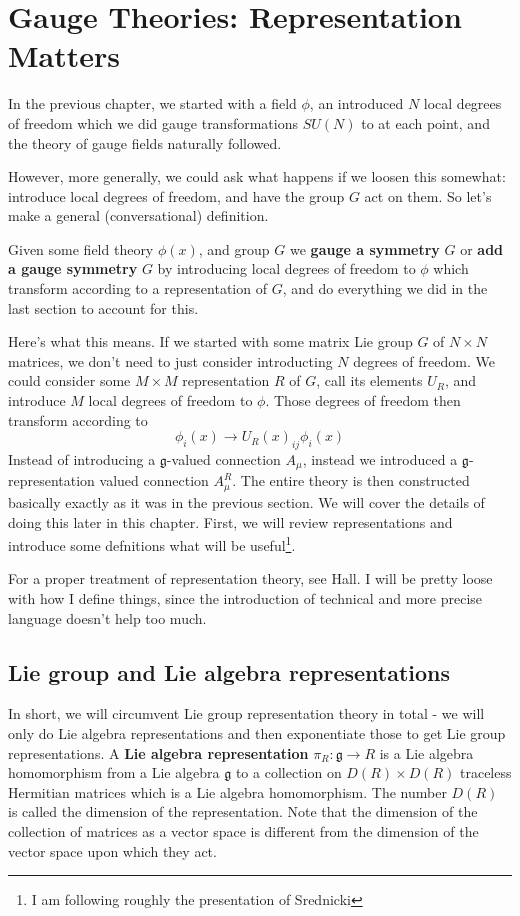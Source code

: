 \documentclass[main.tex]{subfiles}
\begin{document}
\chapter{Gauge Theories: Representation Matters}
In the previous chapter, we started with a field $\phi$, an introduced $N$ local degrees of freedom which we did gauge transformations $SU(N)$ to at each point, and the theory of gauge fields naturally followed.

However, more generally, we could ask what happens if we loosen this somewhat: introduce local degrees of freedom, and have the group $G$ act on them. So let's make a general (conversational) definition.

\begin{defn}
Given some field theory $\phi(x)$, and group $G$ we \textbf{gauge a symmetry} $G$ or \textbf{add a gauge symmetry} $G$ by introducing local degrees of freedom to $\phi$ which transform according to a representation of $G$, and do everything we did in the last section to account for this.
\end{defn}

Here's what this means. If we started  with some matrix Lie group $G$ of $N \times N$ matrices, we don't need to just consider introducting $N$ degrees of freedom. We could consider some $M \times M$ representation $R$ of $G$, call its elements $U_R$, and introduce $M$ local degrees of freedom to $\phi$. Those degrees of freedom then transform according to 
\[
\phi_i (x)\to U_R (x)_{ij} \phi_i (x)
\]
Instead of introducing a $\mathfrak{g}$-valued connection $A_\mu$, instead we introduced a $\mathfrak{g}$-representation valued connection $A_\mu^R$. The entire theory is then constructed basically exactly as it was in the previous section. We will cover the details of doing this later in this chapter. First, we will review representations and introduce some defnitions what will be useful\footnote{I am following roughly the presentation of Srednicki\cite{Sred1}}.

For a proper treatment of representation theory, see Hall\cite{Hall1}. I will be pretty loose with how I define things, since the introduction of technical and more precise language doesn't help too much.

\newpage
\section{Lie group and Lie algebra representations}
In short, we will circumvent Lie group representation theory in total - we will only do Lie algebra representations and then exponentiate those to get Lie group representations. A \textbf{Lie algebra representation} $\pi_R: \mathfrak{g} \to R$ is a Lie algebra homomorphism from a Lie algebra $\mathfrak{g}$ to a collection on $D(R) \times D(R)$ traceless Hermitian matrices which is a Lie algebra homomorphism. The number $D(R)$ is called the dimension of the representation. Note that the dimension of the collection of matrices as a vector space is different from the dimension of the vector space upon which they act. 
\end{document}
